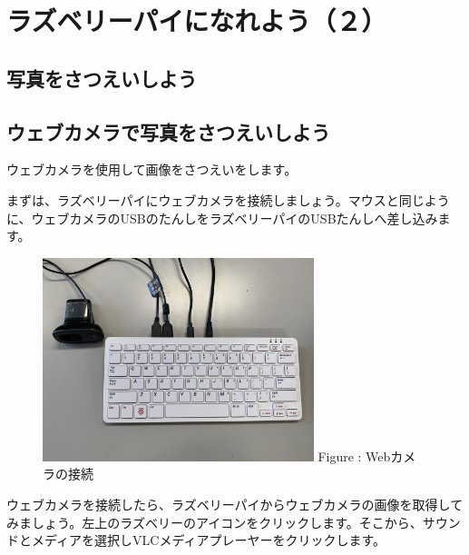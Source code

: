 \documentclass[a4paper,12pt]{jarticle}
\begin{document}
\section[ラズベリーパイになれよう（２）]{ラズベリーパイになれよう（２）}
\subsection{写真をさつえいしよう}
\subsection{\theExercise ウェブカメラで写真をさつえいしよう}
\addtocounter{Exercise}{-1}\label{E:webcam}
ウェブカメラを使用して画像をさつえいをします。

まずは、ラズベリーパイにウェブカメラを接続しましょう。マウスと同じように、ウェブカメラのUSBのたんしをラズベリーパイのUSBたんしへ差し込みます。



\begin{figure}[ht]
  \centering
  \begin{minipage}{8.528cm}
    {\upshape
      \includegraphics[width=7.904cm]{textbook-img112-2023.jpg}
      \newline
      Figure : Webカメラの接続}
  \end{minipage}
\end{figure}
ウェブカメラを接続したら、ラズベリーパイからウェブカメラの画像を取得してみましょう。左上のラズベリーのアイコンをクリックします。そこから、サウンドとメディアを選択しVLCメディアプレーヤーをクリックします。
\end{document}
